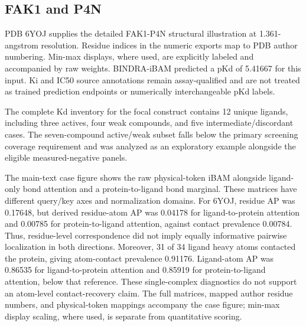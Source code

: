 \documentclass[12pt,a4paper]{article}
\begin{document}
\subsection*{FAK1 and P4N}
PDB 6YOJ supplies the detailed FAK1-P4N structural illustration at 1.361-angstrom resolution. Residue indices in the numeric exports map to PDB author numbering. Min-max displays, where used, are explicitly labeled and accompanied by raw weights. BINDRA-iBAM predicted a pKd of 5.41667 for this input. Ki and IC50 source annotations remain assay-qualified and are not treated as trained prediction endpoints or numerically interchangeable pKd labels.

The complete Kd inventory for the focal construct contains 12 unique ligands, including three actives, four weak compounds, and five intermediate/discordant cases. The seven-compound active/weak subset falls below the primary screening coverage requirement and was analyzed as an exploratory example alongside the eligible measured-negative panels.

The main-text case figure shows the raw physical-token iBAM alongside ligand-only bond attention and a protein-to-ligand bond marginal. These matrices have different query/key axes and normalization domains. For 6YOJ, residue AP was 0.17648, but derived residue-atom AP was 0.04178 for ligand-to-protein attention and 0.00785 for protein-to-ligand attention, against contact prevalence 0.00784. Thus, residue-level correspondence did not imply equally informative pairwise localization in both directions. Moreover, 31 of 34 ligand heavy atoms contacted the protein, giving atom-contact prevalence 0.91176. Ligand-atom AP was 0.86535 for ligand-to-protein attention and 0.85919 for protein-to-ligand attention, below that reference. These single-complex diagnostics do not support an atom-level contact-recovery claim. The full matrices, mapped author residue numbers, and physical-token mappings accompany the case figure; min-max display scaling, where used, is separate from quantitative scoring.
\end{document}
